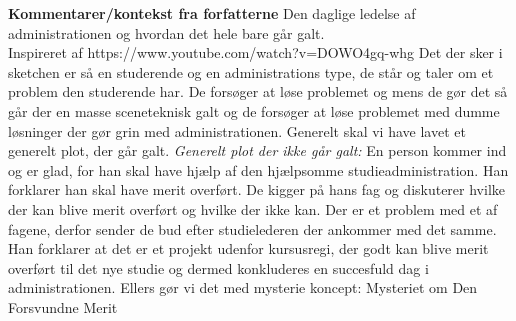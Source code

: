 \documentclass[a4paper,11pt]{article}
\begin{document}
\begin{sketch}

\scene \textbf{Kommentarer/kontekst fra forfatterne}
Den daglige ledelse af administrationen og hvordan det hele bare går galt.\\
Inspireret af https://www.youtube.com/watch?v=DOWO4gq-whg
Det der sker i sketchen er så en studerende og en administrations type, de står og taler om et problem den studerende har. De forsøger at løse problemet og mens de gør det så går der en masse sceneteknisk galt og de forsøger at løse problemet med dumme løsninger der gør grin med administrationen. Generelt skal vi have lavet et generelt plot, der går galt. 
\emph{Generelt plot der ikke går galt:} En person kommer ind og er glad, for han skal have hjælp af den hjælpsomme studieadministration. Han forklarer han skal have merit overført. De kigger på hans fag og diskuterer hvilke der kan blive merit overført og hvilke der ikke kan. Der er et problem med et af fagene, derfor sender de bud efter studielederen der ankommer med det samme. Han forklarer at det er et  projekt udenfor kursusregi, der godt kan blive merit overført til det nye studie og dermed konkluderes en succesfuld dag i administrationen. Ellers gør vi det med mysterie koncept: Mysteriet om Den Forsvundne Merit




\end{sketch}
\end{document}
